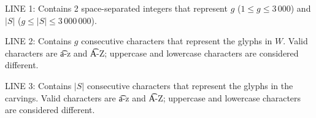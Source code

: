 LINE 1: Contains 2 space-separated integers that represent $g$ ($1 \le g \le 3\,000$) and $|S|$ ($g \le |S| \le 3\,000\,000$).

LINE 2: Contains $g$ consecutive characters that represent the glyphs
in $W$. Valid characters are \t{a-z} and \t{A-Z}; uppercase and
lowercase characters are considered different.

LINE 3: Contains $|S|$ consecutive characters that represent the glyphs
in the carvings. Valid characters are \t{a-z} and \t{A-Z};
uppercase and lowercase characters are considered different.